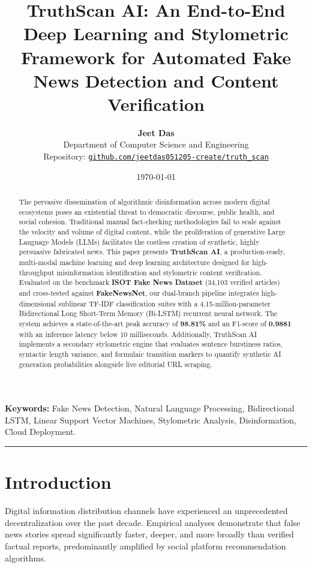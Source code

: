 \documentclass[11pt,a4paper]{article}
\title{
    \vspace{-1.5cm}
    \textbf{\huge TruthScan AI: An End-to-End Deep Learning and Stylometric Framework for Automated Fake News Detection and Content Verification}
    \vspace{0.4cm}
}
\author{
    \textbf{Jeet Das} \\
    Department of Computer Science and Engineering \\
    Repository: \href{https://github.com/jeetdas051205-create/truth_scan}{\texttt{github.com/jeetdas051205-create/truth\_scan}}
}
\date{\today}
\begin{document}
\maketitle
\thispagestyle{fancy}

\begin{abstract}
The pervasive dissemination of algorithmic disinformation across modern digital ecosystems poses an existential threat to democratic discourse, public health, and social cohesion. Traditional manual fact-checking methodologies fail to scale against the velocity and volume of digital content, while the proliferation of generative Large Language Models (LLMs) facilitates the costless creation of synthetic, highly persuasive fabricated news. This paper presents \textbf{TruthScan AI}, a production-ready, multi-modal machine learning and deep learning architecture designed for high-throughput misinformation identification and stylometric content verification. Evaluated on the benchmark \textbf{ISOT Fake News Dataset} (34,103 verified articles) and cross-tested against \textbf{FakeNewsNet}, our dual-branch pipeline integrates high-dimensional sublinear TF-IDF classification suites with a 4.15-million-parameter Bidirectional Long Short-Term Memory (Bi-LSTM) recurrent neural network. The system achieves a state-of-the-art peak accuracy of \textbf{98.81\%} and an F1-score of \textbf{0.9881} with an inference latency below 10 milliseconds. Additionally, TruthScan AI implements a secondary stylometric engine that evaluates sentence burstiness ratios, syntactic length variance, and formulaic transition markers to quantify synthetic AI generation probabilities alongside live editorial URL scraping.
\end{abstract}

\vspace{0.2cm}
\noindent\textbf{Keywords:} Fake News Detection, Natural Language Processing, Bidirectional LSTM, Linear Support Vector Machines, Stylometric Analysis, Disinformation, Cloud Deployment.

\vspace{0.4cm}
\hrule
\vspace{0.4cm}

\section{Introduction}
Digital information distribution channels have experienced an unprecedented decentralization over the past decade. Empirical analyses demonstrate that false news stories spread significantly faster, deeper, and more broadly than verified factual reports, predominantly amplified by social platform recommendation algorithms. 
\end{document}
